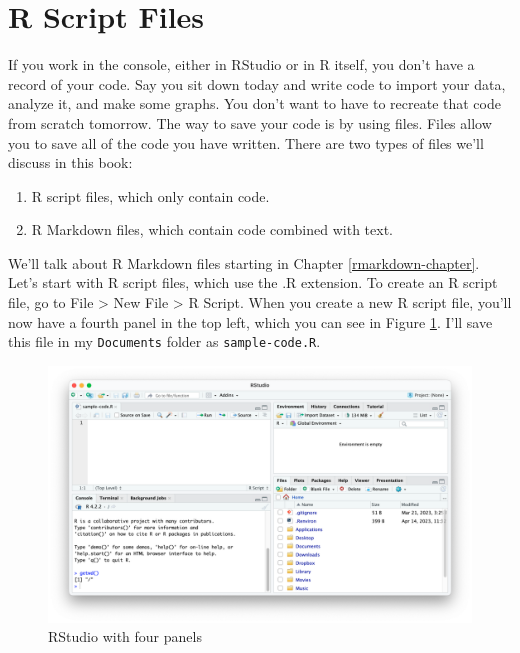\documentclass[
]{book}
\providecommand{\tightlist}{%
  \setlength{\itemsep}{0pt}\setlength{\parskip}{0pt}}
\begin{document}
\hypertarget{r-script-files}{%
\section*{R Script Files}\label{r-script-files}}

If you work in the console, either in RStudio or in R itself, you don't have a record of your code. Say you sit down today and write code to import your data, analyze it, and make some graphs. You don't want to have to recreate that code from scratch tomorrow. The way to save your code is by using files. Files allow you to save all of the code you have written. There are two types of files we'll discuss in this book:

\begin{enumerate}
\def\labelenumi{\arabic{enumi}.}
\tightlist
\item
  R script files, which only contain code.
\item
  R Markdown files, which contain code combined with text.
\end{enumerate}

We'll talk about R Markdown files starting in Chapter \ref{rmarkdown-chapter}. Let's start with R script files, which use the .R extension. To create an R script file, go to File \textgreater{} New File \textgreater{} R Script. When you create a new R script file, you'll now have a fourth panel in the top left, which you can see in Figure \ref{fig:rstudio-four-panels}. I'll save this file in my \texttt{Documents} folder as \texttt{sample-code.R}.

\begin{figure}
\includegraphics[width=1\linewidth]{assets/rstudio-four-panels} \caption{RStudio with four panels}\label{fig:rstudio-four-panels}
\end{figure}
\end{document}

